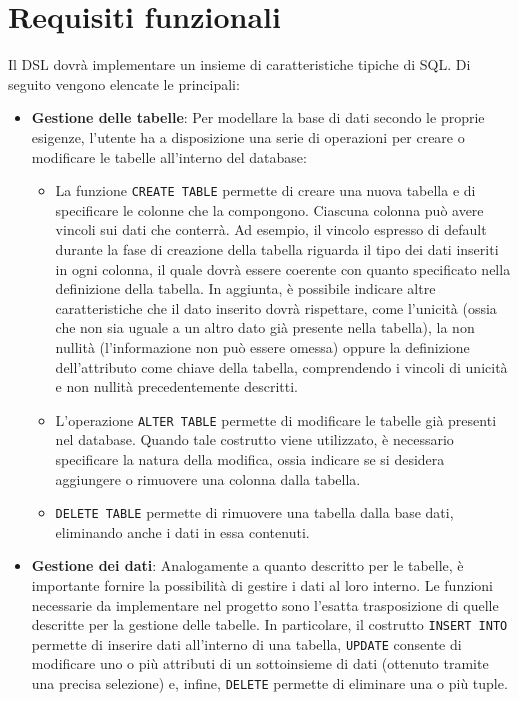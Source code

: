 \documentclass[12pt,a4paper,openright,twoside]{book}
\begin{document}
\section{Requisiti funzionali}
Il \ac{DSL} dovrà implementare un insieme di caratteristiche tipiche di \ac{SQL}. Di seguito vengono elencate 
le principali:
\begin{itemize}
    \item \textbf{Gestione delle tabelle}: Per modellare la base di dati secondo le proprie esigenze, l’utente ha a disposizione una serie 
    di operazioni per creare o modificare le tabelle all’interno del database:

    \begin{itemize}
        \item La funzione \texttt{CREATE TABLE} permette di creare una nuova tabella e di specificare le colonne che la compongono. Ciascuna 
        colonna può avere vincoli sui dati che conterrà. Ad esempio, il vincolo espresso di default durante la fase di creazione della 
        tabella riguarda il tipo dei dati inseriti in ogni colonna, il quale dovrà essere coerente con quanto specificato nella definizione 
        della tabella. In aggiunta, è possibile indicare altre caratteristiche che il dato inserito dovrà rispettare, come l’unicità (ossia 
        che non sia uguale a un altro dato già presente nella tabella), la non nullità (l’informazione non può essere omessa) oppure la 
        definizione dell’attributo come chiave della tabella, comprendendo i vincoli di unicità e non nullità precedentemente descritti.
        \item L’operazione \texttt{ALTER TABLE} permette di modificare le tabelle già presenti nel database. Quando tale costrutto viene 
        utilizzato, è necessario specificare la natura della modifica, ossia indicare se si desidera aggiungere o rimuovere una colonna 
        dalla tabella.
        \item \texttt{DELETE TABLE} permette di rimuovere una tabella dalla base dati, eliminando anche i dati in essa contenuti.
    \end{itemize}

    \item \textbf{Gestione dei dati}: Analogamente a quanto descritto per le tabelle, è importante fornire la possibilità di gestire i dati 
    al loro interno. Le funzioni necessarie da implementare nel progetto sono l’esatta trasposizione di quelle descritte per la gestione 
    delle tabelle. In particolare, il costrutto \texttt{INSERT INTO} permette di inserire dati all’interno di una tabella, \texttt{UPDATE} 
    consente di modificare uno o più attributi di un sottoinsieme di dati (ottenuto tramite una precisa selezione) e, infine, \texttt{DELETE} 
    permette di eliminare una o più tuple.


\end{itemize}
\end{document}
